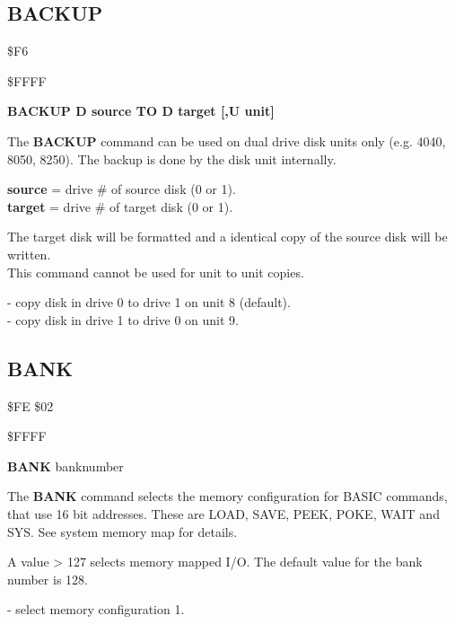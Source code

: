 
\newpage
\subsection{BACKUP}
\begin{description}[leftmargin=3cm,style=nextline]
\item [Token:] \$F6
\item [Address:] \$FFFF
\item [Format:] {\bf BACKUP D source TO D target [,U unit]}
\item [Usage:] The {\bf BACKUP} command can be used on dual drive
   disk units only (e.g. 4040, 8050, 8250).
   The backup is done by the disk unit internally.

   {\bf source} = drive \# of source disk (0 or 1). \\
   {\bf target} = drive \# of target disk (0 or 1).

\item [Remarks:]  The target disk will be formatted and
                 a identical copy of the source disk will be written. \\
                 This command cannot be used for unit to unit copies.

\item [Example:]  - copy disk in drive 0 to
                   drive 1 on unit 8 (default).\\
                  - copy disk in drive 1 to
                   drive 0 on unit 9.\\
\end{description}


\newpage
\subsection{BANK}
\begin{description}[leftmargin=3cm,style=nextline]
\item [Token:] \$FE \$02
\item [Address:] \$FFFF
\item [Format:] {\bf BANK} banknumber
\item [Usage:] The {\bf BANK} command selects the memory configuration
               for BASIC commands, that use 16 bit addresses.
               These are LOAD, SAVE, PEEK, POKE, WAIT and SYS.
               See system memory map for details.
\item [Remarks:] A value > 127 selects memory mapped I/O.
                 The default value for the bank number is 128.
\item [Example:]  - select memory configuration 1.
\end{description}

